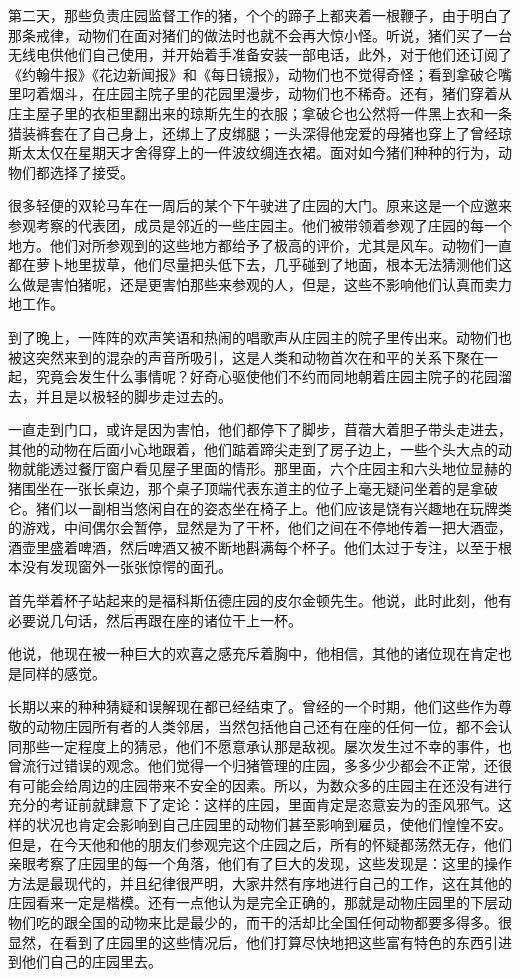 第二天，那些负责庄园监督工作的猪，个个的蹄子上都夹着一根鞭子，由于明白了那条戒律，动物们在面对猪们的做法时也就不会再大惊小怪。听说，猪们买了一台无线电供他们自己使用，并开始着手准备安装一部电话，此外，对于他们还订阅了《约翰牛报》《花边新闻报》和《每日镜报》，动物们也不觉得奇怪；看到拿破仑嘴里叼着烟斗，在庄园主院子里的花园里漫步，动物们也不稀奇。还有，猪们穿着从庄主屋子里的衣柜里翻出来的琼斯先生的衣服；拿破仑也公然将一件黑上衣和一条猎装裤套在了自己身上，还绑上了皮绑腿；一头深得他宠爱的母猪也穿上了曾经琼斯太太仅在星期天才舍得穿上的一件波纹绸连衣裙。面对如今猪们种种的行为，动物们都选择了接受。

很多轻便的双轮马车在一周后的某个下午驶进了庄园的大门。原来这是一个应邀来参观考察的代表团，成员是邻近的一些庄园主。他们被带领着参观了庄园的每一个地方。他们对所参观到的这些地方都给予了极高的评价，尤其是风车。动物们一直都在萝卜地里拔草，他们尽量把头低下去，几乎碰到了地面，根本无法猜测他们这么做是害怕猪呢，还是更害怕那些来参观的人，但是，这些不影响他们认真而卖力地工作。

到了晚上，一阵阵的欢声笑语和热闹的唱歌声从庄园主的院子里传出来。动物们也被这突然来到的混杂的声音所吸引，这是人类和动物首次在和平的关系下聚在一起，究竟会发生什么事情呢？好奇心驱使他们不约而同地朝着庄园主院子的花园溜去，并且是以极轻的脚步走过去的。

一直走到门口，或许是因为害怕，他们都停下了脚步，苜蓿大着胆子带头走进去，其他的动物在后面小心地跟着，他们踮着蹄尖走到了房子边上，一些个头大点的动物就能透过餐厅窗户看见屋子里面的情形。那里面，六个庄园主和六头地位显赫的猪围坐在一张长桌边，那个桌子顶端代表东道主的位子上毫无疑问坐着的是拿破仑。猪们以一副相当悠闲自在的姿态坐在椅子上。他们应该是饶有兴趣地在玩牌类的游戏，中间偶尔会暂停，显然是为了干杯，他们之间在不停地传着一把大酒壶，酒壶里盛着啤酒，然后啤酒又被不断地斟满每个杯子。他们太过于专注，以至于根本没有发现窗外一张张惊愕的面孔。

首先举着杯子站起来的是福科斯伍德庄园的皮尔金顿先生。他说，此时此刻，他有必要说几句话，然后再跟在座的诸位干上一杯。

他说，他现在被一种巨大的欢喜之感充斥着胸中，他相信，其他的诸位现在肯定也是同样的感觉。

长期以来的种种猜疑和误解现在都已经结束了。曾经的一个时期，他们这些作为尊敬的动物庄园所有者的人类邻居，当然包括他自己还有在座的任何一位，都不会认同那些一定程度上的猜忌，他们不愿意承认那是敌视。屡次发生过不幸的事件，也曾流行过错误的观念。他们觉得一个归猪管理的庄园，多多少少都会不正常，还很有可能会给周边的庄园带来不安全的因素。所以，为数众多的庄园主在还没有进行充分的考证前就肆意下了定论：这样的庄园，里面肯定是恣意妄为的歪风邪气。这样的状况也肯定会影响到自己庄园里的动物们甚至影响到雇员，使他们惶惶不安。但是，在今天他和他的朋友们参观完这个庄园之后，所有的怀疑都荡然无存，他们亲眼考察了庄园里的每一个角落，他们有了巨大的发现，这些发现是：这里的操作方法是最现代的，并且纪律很严明，大家井然有序地进行自己的工作，这在其他的庄园看来一定是楷模。还有一点他认为是完全正确的，那就是动物庄园里的下层动物们吃的跟全国的动物来比是最少的，而干的活却比全国任何动物都要多得多。很显然，在看到了庄园里的这些情况后，他们打算尽快地把这些富有特色的东西引进到他们自己的庄园里去。

